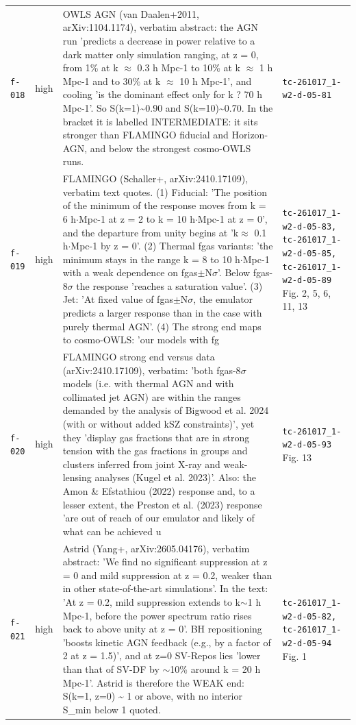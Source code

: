 \documentclass[11pt,a4paper]{article}
\begin{document}
\begin{longtable}{@{}p{}p{}p{}p{}@{}}
\texttt{f-018} & high & OWLS AGN (van Daalen+2011, arXiv:1104.1174), verbatim abstract: the AGN run 'predicts a decrease in power relative to a dark matter only simulation ranging, at z = 0, from 1\% at k $\approx$ 0.3 h Mpc-1 to 10\% at k $\approx$ 1 h Mpc-1 and to 30\% at k $\approx$ 10 h Mpc-1', and cooling 'is the dominant effect only for k ? 70 h Mpc-1'. So S(k=1)\textasciitilde{}0.90 and S(k=10)\textasciitilde{}0.70. In the bracket it is labelled INTERMEDIATE: it sits stronger than FLAMINGO fiducial and Horizon-AGN, and below the strongest cosmo-OWLS runs. & \texttt{tc-261017\_\allowbreak{}1-w2-d-05-81} \\
\texttt{f-019} & high & FLAMINGO (Schaller+, arXiv:2410.17109), verbatim text quotes. (1) Fiducial: 'The position of the minimum of the response moves from k = 6 h$\cdot$Mpc-1 at z = 2 to k = 10 h$\cdot$Mpc-1 at z = 0', and the departure from unity begins at 'k$\approx$ 0.1 h$\cdot$Mpc-1 by z = 0'. (2) Thermal fgas variants: 'the minimum stays in the range k = 8 to 10 h$\cdot$Mpc-1 with a weak dependence on fgas$\pm$N$\sigma$'. Below fgas-8$\sigma$ the response 'reaches a saturation value'. (3) Jet: 'At fixed value of fgas$\pm$N$\sigma$, the emulator predicts a larger response than in the case with purely thermal AGN'. (4) The strong end maps to cosmo-OWLS: 'our models with fg & \texttt{tc-261017\_\allowbreak{}1-w2-d-05-83,\allowbreak{} tc-261017\_\allowbreak{}1-w2-d-05-85,\allowbreak{} tc-261017\_\allowbreak{}1-w2-d-05-89} Fig. 2, 5, 6, 11, 13 \\
\texttt{f-020} & high & FLAMINGO strong end versus data (arXiv:2410.17109), verbatim: 'both fgas-8$\sigma$ models (i.e. with thermal AGN and with collimated jet AGN) are within the ranges demanded by the analysis of Bigwood et al. 2024 (with or without added kSZ constraints)', yet they 'display gas fractions that are in strong tension with the gas fractions in groups and clusters inferred from joint X-ray and weak-lensing analyses (Kugel et al. 2023)'. Also: the Amon \& Efstathiou (2022) response and, to a lesser extent, the Preston et al. (2023) response 'are out of reach of our emulator and likely of what can be achieved u & \texttt{tc-261017\_\allowbreak{}1-w2-d-05-93} Fig. 13 \\
\texttt{f-021} & high & Astrid (Yang+, arXiv:2605.04176), verbatim abstract: 'We find no significant suppression at z = 0 and mild suppression at z = 0.2, weaker than in other state-of-the-art simulations'. In the text: 'At z = 0.2, mild suppression extends to k$\sim$1 h Mpc-1, before the power spectrum ratio rises back to above unity at z = 0'. BH repositioning 'boosts kinetic AGN feedback (e.g., by a factor of 2 at z = 1.5)', and at z=0 SV-Repos lies 'lower than that of SV-DF by $\sim$10\% around k = 20 h Mpc-1'. Astrid is therefore the WEAK end: S(k=1, z=0) \textasciitilde{} 1 or above, with no interior S\_min below 1 quoted. & \texttt{tc-261017\_\allowbreak{}1-w2-d-05-82,\allowbreak{} tc-261017\_\allowbreak{}1-w2-d-05-94} Fig. 1 \\

\end{longtable}
\end{document}
